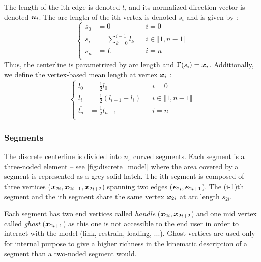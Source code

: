 The length of the ith edge is denoted $l_i $ and its normalized direction vector is denoted $\boldsymbol{u}_i$. The arc length of the ith vertex is denoted $s_i$ and is given by : 
\begin{equation}
	\left\{
	\begin{aligned}
		s_0 	&= 0 				& 	&i = 0		\\
		s_i 	&= \sum_{k=0}^{i-1} l_k	&	&i \in \llbracket 1, n-1 \rrbracket	\\
		s_n 	&=  L 				&	&i = n		\\
	\end{aligned}
	\right.
\end{equation}
Thus, the centerline is parametrized by arc length and $\Gamma(s_i) = \boldsymbol{x}_i$. Additionally, we define the vertex-based mean length at vertex $\boldsymbol{x}_i$ : 
\begin{equation}
	\left\{
	\begin{aligned}
		\overbar{l_0} 	& =  \tfrac{1}{2}l_0				&		&i = 0					\\
		\overbar{l_i}	& =  \tfrac{1}{2}(l_{i-1} + l_i)		&		&i \in \llbracket 1, n-1 \rrbracket	\\
		\overbar{l_n} 	& =  \tfrac{1}{2}l_{n-1} 			&		&i = n					\\
	\end{aligned}
	\right.
\end{equation}

\subsubsection{Segments}

The discrete centerline is divided into $n_s$ curved segments. Each segment is a three-noded element -- see \cref{fig:discrete_model} where the area covered by a segment is represented as a grey solid hatch. The ith segment is composed of three vertices ($\boldsymbol{x}_{2i}, \boldsymbol{x}_{2i+1},  \boldsymbol{x}_{2i+2}$) spanning two edges ($\boldsymbol{e}_{2i}, \boldsymbol{e}_{2i+1}$). The (i-1)th segment and the ith segment share the same vertex $\boldsymbol{x}_{2i}$ at arc length $s_{2i}$.

Each segment has two end vertices called \emph{handle} ($\boldsymbol{x}_{2i}, \boldsymbol{x}_{2i+2}$) and one mid vertex called \emph{ghost} ($\boldsymbol{x}_{2i+1}$) as this one is not accessible to the end user in order to interact with the model (link, restrain, loading, ...). Ghost vertices are used only for internal purpose to give a higher richness in the kinematic description of a segment than a two-noded segment would.

